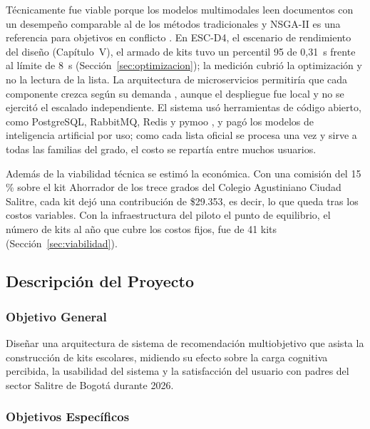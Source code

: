 Técnicamente fue viable porque los modelos multimodales leen documentos con un desempeño comparable al de
los métodos tradicionales \citep{shen_ocr_2026} y NSGA-II es una referencia para objetivos en conflicto
\citep{deb_fast_2002}. En ESC-D4, el escenario de rendimiento del diseño (Capítulo~V), el armado de kits tuvo un percentil 95 de
0,31~s frente al límite de 8~s (Sección~\ref{sec:optimizacion}); la medición cubrió la optimización y no la lectura de la lista. La
arquitectura de microservicios permitiría que cada componente crezca según su demanda
\citep{newman_building_2021}, aunque el despliegue fue local y no se ejercitó el escalado independiente. El sistema usó herramientas de código abierto, como PostgreSQL, RabbitMQ, Redis y
pymoo \citep{blank_pymoo_2020}, y pagó los modelos de inteligencia artificial por uso; como cada lista oficial se
procesa una vez y sirve a todas las familias del grado, el costo se repartía entre muchos usuarios.\par

Además de la viabilidad técnica se estimó la económica. Con una comisión del 15\,\% sobre el kit Ahorrador de los trece grados del Colegio Agustiniano Ciudad Salitre, cada kit dejó una contribución de \$29.353, es decir, lo que queda tras los costos variables. Con la infraestructura del piloto el punto de equilibrio, el número de kits al año que cubre los costos fijos, fue de 41 kits (Sección~\ref{sec:viabilidad}).\par

\subsection{Descripción del Proyecto}

\subsubsection{Objetivo General}

Diseñar una arquitectura de sistema de recomendación multiobjetivo que asista la
construcción de kits escolares, midiendo su efecto sobre la carga cognitiva percibida, la
usabilidad del sistema y la satisfacción del usuario con padres del sector Salitre de
Bogotá durante 2026.

\subsubsection{Objetivos Específicos}
\label{sec:objetivos}

